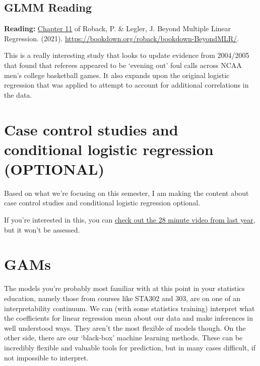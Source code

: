 \documentclass[
  openany]{book}
\begin{document}
\hypertarget{glmm-reading}{%
\subsection{GLMM Reading}\label{glmm-reading}}

\textbf{Reading:} \href{https://bookdown.org/roback/bookdown-BeyondMLR/ch-glms.html}{Chapter 11} of Roback, P. \& Legler, J. Beyond Multiple Linear Regression. (2021). \url{https://bookdown.org/roback/bookdown-BeyondMLR/}.

This is a really interesting study that looks to update evidence from 2004/2005 that found that referees appeared to be `evening out' foul calls across NCAA men's college basketball games. It also expands upon the original logistic regression that was applied to attempt to account for additional correlations in the data.

\hypertarget{case-control-studies-and-conditional-logistic-regression-optional}{%
\section{Case control studies and conditional logistic regression (OPTIONAL)}\label{case-control-studies-and-conditional-logistic-regression-optional}}

Based on what we're focusing on this semester, I am making the content about case control studies and conditional logistic regression optional.

If you're interested in this, you can \href{https://play.library.utoronto.ca/watch/71756e16598c3010d53f732f4be115b9}{check out the 28 minute video from last year}, but it won't be assessed.

\hypertarget{gams}{%
\section{GAMs}\label{gams}}

The models you're probably most familiar with at this point in your statistics education, namely those from courses like STA302 and 303, are on one of an interpretability continuum. We can (with some statistics training) interpret what the coefficients for linear regression mean about our data and make inferences in well understood ways. They aren't the most flexible of models though. On the other side, there are our `black-box' machine learning methods. These can be incredibly flexible and valuable tools for prediction, but in many cases difficult, if not impossible to interpret.
\end{document}
